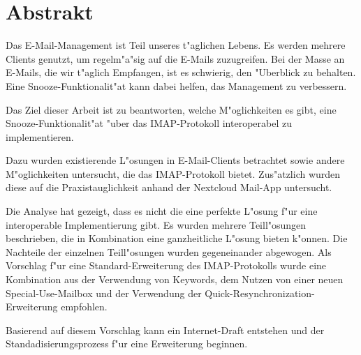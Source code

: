 \chapter*{Abstrakt}
\label{sec:Abstrakt}

Das E-Mail-Management ist Teil unseres t"aglichen Lebens. Es werden mehrere Clients genutzt, um regelm"a"sig auf die E-Mails zuzugreifen. Bei der Masse an E-Mails, die wir t"aglich Empfangen, ist es schwierig, den "Uberblick zu behalten. Eine Snooze-Funktionalit"at kann dabei helfen, das Management zu verbessern.

Das Ziel dieser Arbeit ist zu beantworten, welche M"oglichkeiten es gibt, eine Snooze-Funktionalit"at "uber das IMAP-Protokoll interoperabel zu implementieren.

Dazu wurden existierende L"osungen in E-Mail-Clients betrachtet sowie andere M"oglichkeiten untersucht, die das IMAP-Protokoll bietet. Zus"atzlich wurden diese auf die Praxistauglichkeit anhand der Nextcloud Mail-App untersucht.

Die Analyse hat gezeigt, dass es nicht die eine perfekte L"osung f"ur eine interoperable Implementierung gibt. Es wurden mehrere Teill"osungen beschrieben, die in Kombination eine ganzheitliche L"osung bieten k"onnen. Die Nachteile der einzelnen Teill"osungen wurden gegeneinander abgewogen. Als Vorschlag f"ur eine Standard-Erweiterung des IMAP-Protokolls wurde eine Kombination aus der Verwendung von Keywords, dem Nutzen von einer neuen Special-Use-Mailbox und der Verwendung der Quick-Resynchronization-Erweiterung empfohlen.  

Basierend auf diesem Vorschlag kann ein Internet-Draft entstehen und der Standadisierungsprozess f"ur eine Erweiterung beginnen.
